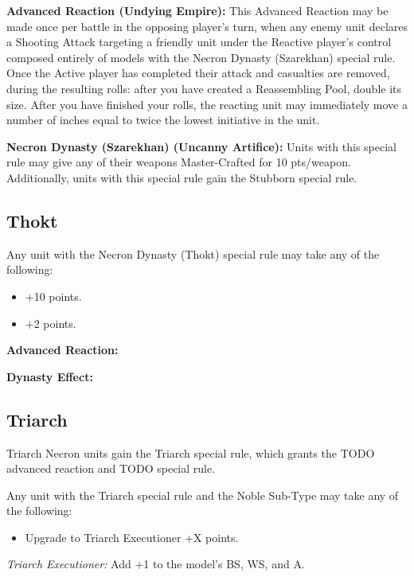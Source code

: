 \textbf{Advanced Reaction (Undying Empire):} This Advanced Reaction may be made once per battle in the opposing player's turn, when any enemy unit declares a Shooting Attack targeting a friendly unit under the Reactive player's control composed entirely of models with the Necron Dynasty (Szarekhan) special rule. Once the Active player has completed their attack and casualties are removed, during the resulting  rolls: after you have created a Reassembling Pool, double its size. After you have finished your  rolls, the reacting unit may immediately move a number of inches equal to twice the lowest initiative in the unit.

\textbf{Necron Dynasty (Szarekhan) (Uncanny Artifice):} Units with this special rule may give any of their weapons Master-Crafted for 10 pts/weapon. Additionally, units with this special rule gain the Stubborn special rule.


\subsection{Thokt}

Any unit with the Necron Dynasty (Thokt) special rule may take any of the following:
\begin{itemize}
	\item {} \dotfill +10 points.
	\item {} \dotfill +2 points.
\end{itemize}

\textbf{Advanced Reaction:}

\textbf{Dynasty Effect:} 


\subsection{Triarch}

Triarch Necron units gain the Triarch special rule, which grants the TODO advanced reaction and TODO special rule.

Any unit with the Triarch special rule and the Noble Sub-Type may take any of the following:
\begin{itemize}
	\item Upgrade to Triarch Executioner \dotfill +X points.
\end{itemize}

\textit{Triarch Executioner:} Add +1 to the model's BS, WS, and A.

